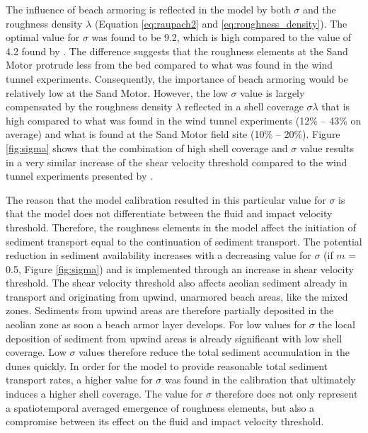 The influence of beach armoring is reflected in the model by both
$\sigma$ and the roughness density $\lambda$ (Equation
\ref{eq:raupach2} and \ref{eq:roughness_density}). The optimal value
for $\sigma$ was found to be 9.2, which is high compared to the value
of 4.2 found by \citet{McKennaNeuman2012}. The difference suggests
that the roughness elements at the Sand Motor protrude less from the
bed compared to what was found in the wind tunnel
experiments. Consequently, the importance of beach armoring would be
relatively low at the Sand Motor. However, the low $\sigma$ value is
largely compensated by the roughness density $\lambda$ reflected in a
shell coverage $\sigma \lambda$ that is high compared to what was
found in the wind tunnel experiments (12\% -- 43\% on average) and
what is found at the Sand Motor field site (10\% -- 20\%). Figure
\ref{fig:sigma} shows that the combination of high shell coverage and
$\sigma$ value results in a very similar increase of the shear
velocity threshold compared to the wind tunnel experiments presented
by \citet{McKennaNeuman2012}.

The reason that the model calibration resulted in this particular
value for $\sigma$ is that the model does not differentiate between
the fluid and impact velocity threshold.  Therefore, the roughness
elements in the model affect the initiation of sediment transport
equal to the continuation of sediment transport. The potential
reduction in sediment availability increases with a decreasing value
for $\sigma$ (if $m$ = 0.5, Figure \ref{fig:sigma}) and is implemented
through an increase in shear velocity threshold. The shear velocity
threshold also affects aeolian sediment already in transport and
originating from upwind, unarmored beach areas, like the mixed
zones. Sediments from upwind areas are therefore partially deposited
in the aeolian zone as soon a beach armor layer develops. For low
values for $\sigma$ the local deposition of sediment from upwind areas
is already significant with low shell coverage. Low $\sigma$ values
therefore reduce the total sediment accumulation in the dunes
quickly. In order for the model to provide reasonable total sediment
transport rates, a higher value for $\sigma$ was found in the
calibration that ultimately induces a higher shell coverage. The value
for $\sigma$ therefore does not only represent a spatiotemporal
averaged emergence of roughness elements, but also a compromise
between its effect on the fluid and impact velocity threshold.

